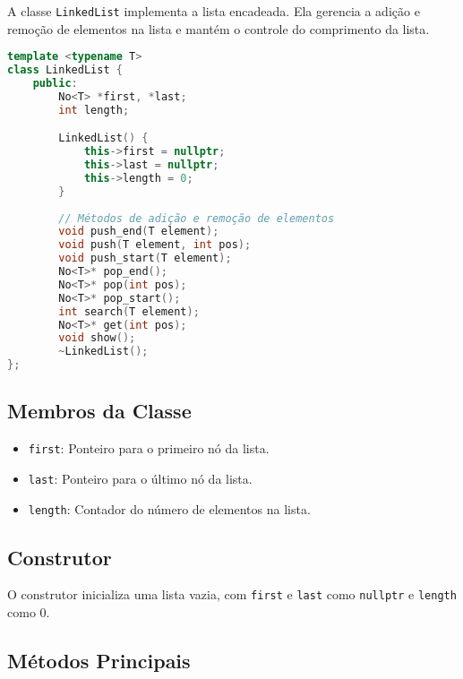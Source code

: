\documentclass[a4paper,12pt]{article}
\begin{document}
A classe \texttt{LinkedList} implementa a lista encadeada. Ela gerencia a adição e remoção de elementos na lista e mantém o controle do comprimento da lista.

\begin{lstlisting}[language=C++, caption=Classe LinkedList]
template <typename T>
class LinkedList {
    public:
        No<T> *first, *last;
        int length;

        LinkedList() {
            this->first = nullptr;
            this->last = nullptr;
            this->length = 0;
        }
        
        // Métodos de adição e remoção de elementos
        void push_end(T element);
        void push(T element, int pos);
        void push_start(T element);
        No<T>* pop_end();
        No<T>* pop(int pos);
        No<T>* pop_start();
        int search(T element);
        No<T>* get(int pos);
        void show();
        ~LinkedList();
};
\end{lstlisting}

\subsection{Membros da Classe}

\begin{itemize}
    \item \texttt{first}: Ponteiro para o primeiro nó da lista.
    \item \texttt{last}: Ponteiro para o último nó da lista.
    \item \texttt{length}: Contador do número de elementos na lista.
\end{itemize}

\subsection{Construtor}

O construtor inicializa uma lista vazia, com \texttt{first} e \texttt{last} como \texttt{nullptr} e \texttt{length} como 0.

\subsection{Métodos Principais}
\end{document}

